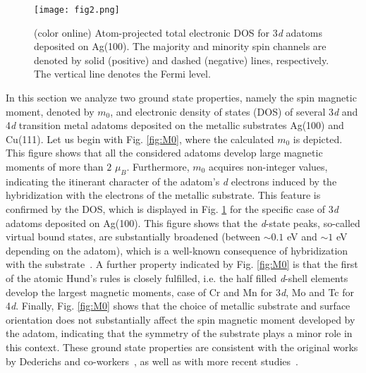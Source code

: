 \documentclass[prb,footinbib,showpacs,twocolumn,amsmath,amssymb]{revtex4}
\begin{document}
\begin{figure}[t]
\texttt{[image: fig2.png]}
\caption{(color online) Atom-projected total electronic DOS for 3\textit{d} adatoms deposited on Ag(100).
The majority and minority spin channels are denoted by solid (positive) and
dashed (negative) lines, respectively. The vertical line denotes the Fermi level. 
}
\label{fig:DOS}
\end{figure}


In this section we analyze two ground state properties, namely the spin 
magnetic moment,  denoted by $m_{0}$, and electronic 
density of states (DOS) 
of several 3\textit{d} and 4\textit{d} transition metal adatoms deposited on the metallic substrates Ag(100) 
and Cu(111). Let us begin with Fig. \ref{fig:M0}, where the calculated  $m_{0}$ is depicted. 
This figure shows that all the considered  adatoms develop large magnetic moments 
of more than $2$ $\mu_{B}$. Furthermore,  $m_{0}$ acquires non-integer values, 
indicating the itinerant character of the 
adatom's \textit{d} electrons
induced by the hybridization with the electrons of the metallic substrate. 
This feature 
is confirmed by the DOS, which is  displayed in Fig. \ref{fig:DOS} for the specific case of 3\textit{d} 
adatoms deposited on Ag(100).
This figure shows that the \textit{d}-state peaks, so-called virtual bound states, 
are substantially broadened 
(between $\sim0.1$ eV and $\sim1$ eV depending on the adatom),
which is a well-known consequence of 
hybridization with 
the substrate~\cite{wildberger_magnetic_1995,PhysRevLett.106.037205,dias_relativistic_2015}.
A further property indicated  by  Fig. \ref{fig:M0} is that the first of the
atomic Hund's rules is closely fulfilled, i.e.
the half filled \textit{d}-shell elements develop the largest magnetic moments, case of
Cr and Mn for 3\textit{d}, Mo and Tc for 4\textit{d}.
Finally, Fig. \ref{fig:M0} shows that the choice of metallic substrate and surface orientation
does not substantially affect the spin magnetic moment developed by the adatom, indicating that 
the symmetry of the substrate plays a minor role in this context. 
These ground state properties are consistent with the original works by 
Dederichs and co-workers~\cite{oswald_giant_1986,wildberger_magnetic_1995,lang_local_1994},
as well as with more recent studies~\cite{lounis_dynamical_2010,lounis_theory_2011,dias_relativistic_2015,PhysRevB.91.104420,PhysRevB.89.235439,ibanez-azpiroz_zero-point_2016}.
\end{document}
